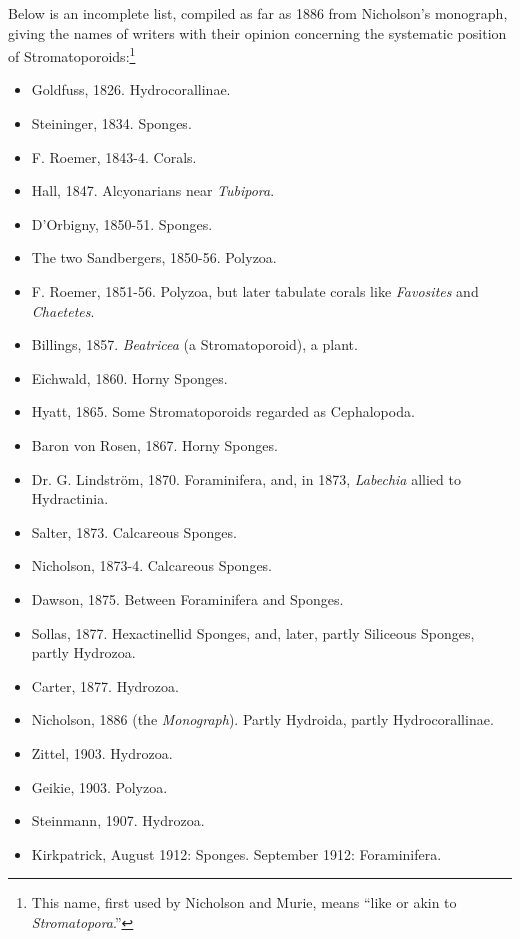 \documentclass[a4paper, 12pt, oneside]{article}
\begin{document}
Below is an incomplete list, compiled as far as 1886 from Nicholson's monograph, giving the names of writers with their opinion concerning the systematic position of Stromatoporoids:\footnote{This name, first used by Nicholson and Murie, means ``like or akin to \emph{Stromatopora}.''}
\begin{itemize}
    \item Goldfuss, 1826. Hydrocorallinae.
    \item Steininger, 1834. Sponges.
    \item F. Roemer, 1843-4. Corals.
    \item Hall, 1847. Alcyonarians near \emph{Tubipora}.
    \item D'Orbigny, 1850-51. Sponges.
    \item The two Sandbergers, 1850-56. Polyzoa.
    \item F. Roemer, 1851-56. Polyzoa, but later tabulate corals like \emph{Favosites} and \emph{Chaetetes}.
    \item Billings, 1857. \emph{Beatricea} (a Stromatoporoid), a plant.
    \item Eichwald, 1860. Horny Sponges.
    \item Hyatt, 1865. Some Stromatoporoids regarded as Cephalopoda.
    \item Baron von Rosen, 1867. Horny Sponges.
    \item Dr. G. Lindström, 1870. Foraminifera, and, in 1873, \emph{Labechia} allied to Hydractinia.
    \item Salter, 1873. Calcareous Sponges.
    \item Nicholson, 1873-4. Calcareous Sponges.
    \item Dawson, 1875. Between Foraminifera and Sponges.
    \item Sollas, 1877. Hexactinellid Sponges, and, later, partly Siliceous Sponges, partly Hydrozoa.
    \item Carter, 1877. Hydrozoa.
    \item Nicholson, 1886 (the \emph{Monograph}). Partly Hydroida, partly Hydrocorallinae.
    \item Zittel, 1903. Hydrozoa.
    \item Geikie, 1903. Polyzoa.
    \item Steinmann, 1907. Hydrozoa.
    \item Kirkpatrick, August 1912: Sponges. September 1912: Foraminifera.
\end{itemize}
\end{document}
